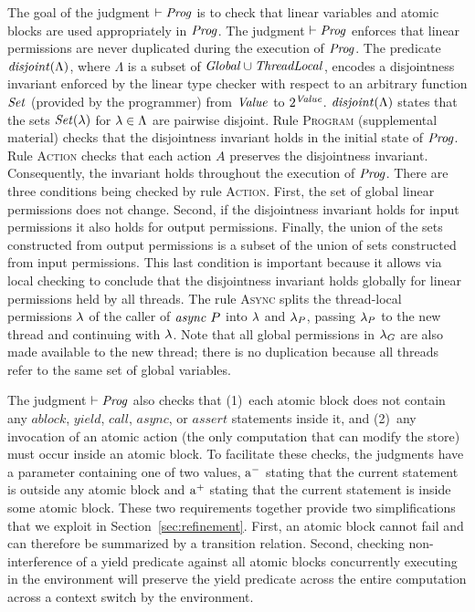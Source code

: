 The goal of the judgment $\vdash \mathit{Prog}$ is to check that
linear variables and atomic blocks are used appropriately in $\mathit{Prog}$.
The judgment $\vdash \mathit{Prog}$ enforces that linear permissions are never duplicated during the 
execution of $\mathit{Prog}$.
The predicate $\mathit{disjoint}(\Lambda)$, where $\Lambda$ is a subset of $\mathit{Global} \cup \mathit{ThreadLocal}$,
encodes a disjointness invariant enforced by the linear type checker
with respect to an arbitrary function $\mathit{Set}$ (provided by the programmer) from $\mathit{Value}$ to $2^{\mathit{Value}}$.
$\mathit{disjoint}(\Lambda)$ states that the sets $\mathit{Set}(\lambda)$ for $\lambda \in \Lambda$ are pairwise disjoint.
Rule \textsc{Program} (supplemental material) checks that the disjointness invariant holds in the initial state of $\mathit{Prog}$.
Rule \textsc{Action} checks that each action $A$ preserves the disjointness invariant.
Consequently, the invariant holds throughout the execution of $\mathit{Prog}$.
There are three conditions being checked by rule \textsc{Action}.
First, the set of global linear permissions does not change.
Second, if the disjointness invariant holds for input permissions it also holds for output permissions.
Finally, the union of the sets constructed from output permissions is a subset of the union of sets
constructed from input permissions.  
This last condition is important because it allows via local checking to conclude that the disjointness invariant holds globally
for linear permissions held by all threads.
The rule \textsc{Async} splits the thread-local permissions $\lambda$ of the caller of $\mathit{async}\ P$ into $\lambda$ 
and $\lambda_P$, passing $\lambda_P$ to the new thread and continuing with $\lambda$.
Note that all global permissions in $\lambda_G$ are also made available to the new thread;
there is no duplication because all threads refer to the same set of global variables.

The judgment $\vdash \mathit{Prog}$ also checks that 
(1)~each atomic block does not contain any $\mathit{ablock}$, $\mathit{yield}$, $\mathit{call}$, $\mathit{async}$, or $\mathit{assert}$ statements inside it, and
(2)~any invocation of an atomic action (the only computation that can modify the store) must occur inside an atomic block.
To facilitate these checks, the judgments have a parameter containing one of two values,
$\mathrm{a^-}$ stating that the current statement is outside any atomic block and
$\mathrm{a^+}$ stating that the current statement is inside some atomic block.
These two requirements together provide two simplifications that we exploit in Section~\ref{sec:refinement}.
First, an atomic block cannot fail and can therefore be summarized by a transition relation.
Second, checking non-interference of a yield predicate against all atomic blocks concurrently executing 
in the environment will preserve the yield predicate across the entire computation across a context switch by the environment.

